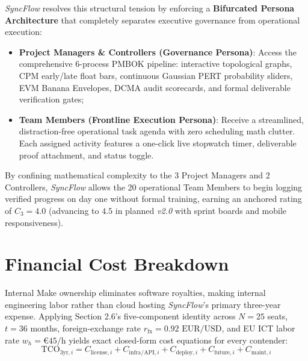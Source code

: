 \textit{SyncFlow} resolves this structural tension by enforcing a \textbf{Bifurcated Persona Architecture} that completely separates executive governance from operational execution:
\begin{itemize}[itemsep=1pt,topsep=1pt]
    \item \textbf{Project Managers \& Controllers (Governance Persona)}: Access the comprehensive 6-process PMBOK pipeline: interactive topological graphs, CPM early/late float bars, continuous Gaussian PERT probability sliders, EVM Banana Envelopes, DCMA audit scorecards, and formal deliverable verification gates;
    \item \textbf{Team Members (Frontline Execution Persona)}: Receive a streamlined, distraction-free operational task agenda with zero scheduling math clutter. Each assigned activity features a one-click live stopwatch timer, deliverable proof attachment, and status toggle.
\end{itemize}
By confining mathematical complexity to the 3 Project Managers and 2 Controllers, \textit{SyncFlow} allows the 20 operational Team Members to begin logging verified progress on day one without formal training, earning an anchored rating of $C_3 = 4.0$ (advancing to $4.5$ in planned \textit{v2.0} with sprint boards and mobile responsiveness).

\vspace{3mm}

\section{Financial Cost Breakdown}
Internal Make ownership eliminates software royalties, making internal engineering labor rather than cloud hosting \textit{SyncFlow}'s primary three-year expense. Applying Section 2.6's five-component identity across $N = 25$ seats, $t = 36$ months, foreign-exchange rate $r_{\text{fx}} = 0.92\text{ EUR/USD}$, and EU ICT labor rate $w_h = \text{€45/h}$ \cite{eurostat} yields exact closed-form cost equations for every contender:
$$
    \text{TCO}_{3\text{yr},i} = C_{\text{license},i} + C_{\text{infra/API},i} + C_{\text{deploy},i} + C_{\text{future},i} + C_{\text{maint},i}
$$

